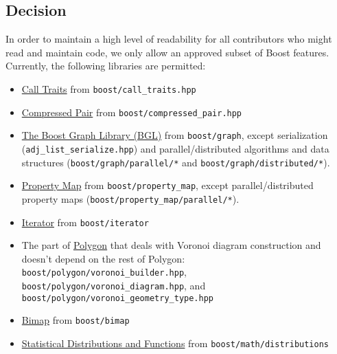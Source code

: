 \subsection{Decision}
In order to maintain a high level of readability for all contributors who might read and maintain code, we only allow an approved subset of Boost features. Currently, the following libraries are permitted:
\begin{itemize}
\item \href{https://www.boost.org/libs/utility/call_traits.htm}{Call Traits} from \texttt{boost/call_traits.hpp}
\item \href{https://www.boost.org/libs/utility/compressed_pair.htm}{Compressed Pair} from \texttt{boost/compressed_pair.hpp}
\item \href{https://www.boost.org/libs/graph/}{The Boost Graph Library (BGL)} from \texttt{boost/graph}, except serialization (\texttt{adj_list_serialize.hpp}) and parallel/distributed algorithms and data structures (\texttt{boost/graph/parallel/*} and \texttt{boost/graph/distributed/*}).
\item \href{https://www.boost.org/libs/property_map/}{Property Map} from \texttt{boost/property_map}, except parallel/distributed property maps (\texttt{boost/property_map/parallel/*}).
\item \href{https://www.boost.org/libs/iterator/}{Iterator} from \texttt{boost/iterator}
\item The part of \href{https://www.boost.org/libs/polygon/}{Polygon} that deals with Voronoi diagram construction and doesn't depend on the rest of Polygon: \texttt{boost/polygon/voronoi_builder.hpp}, \texttt{boost/polygon/voronoi_diagram.hpp}, and \texttt{boost/polygon/voronoi_geometry_type.hpp}
\item \href{https://www.boost.org/libs/bimap/}{Bimap} from \texttt{boost/bimap}
\item \href{https://www.boost.org/libs/math/doc/html/dist.html}{Statistical Distributions and Functions} from \texttt{boost/math/distributions}

\end{itemize}
